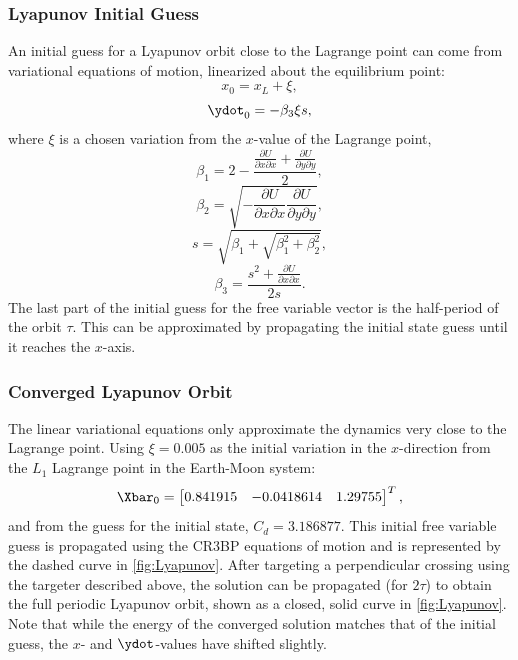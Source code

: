 \subsubsection{Lyapunov Initial Guess}
An initial guess for a Lyapunov orbit close to the Lagrange point can come from variational
equations of motion, linearized about the equilibrium point:
\begin{equation}
    x_{0}=x_{L}+\xi,
    \label{eq:xvar}
\end{equation}
\begin{equation}
    \ydot_{0}=-\beta_{3}\xi s,
    \label{eq:ydotvar}
\end{equation}
where $\xi$ is a chosen variation from the $x$-value of the Lagrange point,
\begin{equation}
    \beta_{1}=2-\frac{\frac{\partial U}{\partial x\partial x}+\frac{\partial U}{\partial y\partial y}}{2},
    \label{eq:beta1}
\end{equation}
\begin{equation}
    \beta_{2}=\sqrt{-\frac{\partial U}{\partial x\partial x}\frac{\partial U}{\partial y\partial y}},
    \label{eq:beta2}
\end{equation}
\begin{equation}
    s=\sqrt{\beta_{1}+\sqrt{\beta_{1}^{2}+\beta_{2}^{2}}},
    \label{eq:s}
\end{equation}
\begin{equation}
    \beta_{3}=\frac{s^{2}+\frac{\partial U}{\partial x\partial x}}{2s}.
    \label{eq:beta3}
\end{equation}
The last part of the initial guess for the free variable vector is the half-period of the orbit
$\tau$. This can be approximated by propagating the initial state guess until it reaches the
$x$-axis.

\subsubsection{Converged Lyapunov Orbit}
The linear variational equations only approximate the dynamics very close to the Lagrange point.
Using $\xi=0.005$ as the initial variation in the $x$-direction from the $L_{1}$ Lagrange point in
the Earth-Moon system:
\begin{equation}
    \Xbar_{0}=\begin{bmatrix}   0.841915    &   -0.0418614  &   1.29755\end{bmatrix}^{T},
    \label{eq:Lyapunovguess}
\end{equation}
and from the guess for the initial state, $C_{d}=3.186877$. This initial free variable guess is
propagated using the CR3BP equations of motion and is represented by the dashed curve in
\cref{fig:Lyapunov}. After targeting a perpendicular crossing using the targeter described above,
the solution can be propagated (for $2\tau$) to obtain the full periodic Lyapunov orbit, shown as
a closed, solid curve in \cref{fig:Lyapunov}. Note that while the energy of the converged solution
matches that of the initial guess, the $x$- and $\ydot$-values have shifted slightly.

